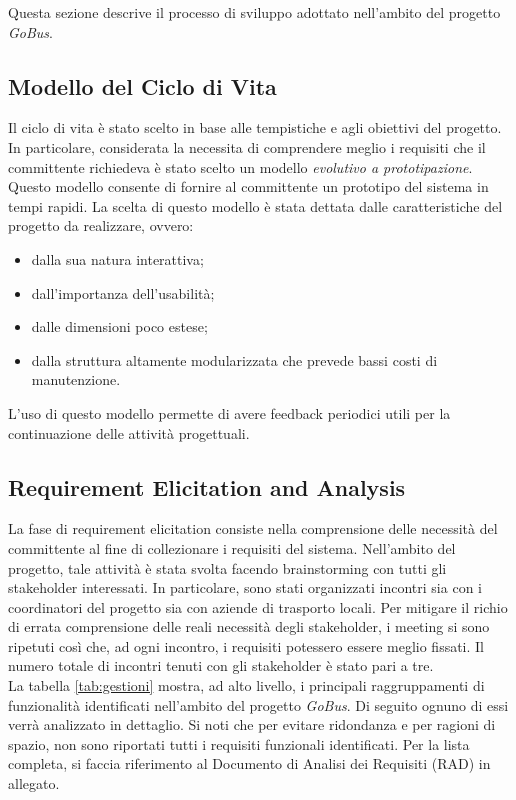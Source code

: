 Questa sezione descrive il processo di sviluppo adottato nell\rq ambito del progetto \emph{GoBus}.

\subsection{Modello del Ciclo di Vita}
Il ciclo di vita è stato scelto in base alle tempistiche e agli obiettivi del progetto. In particolare, considerata la necessita di comprendere meglio i requisiti che il committente richiedeva \`{e} stato scelto un modello \emph{evolutivo a prototipazione}. Questo modello consente di fornire al committente un prototipo del sistema in tempi rapidi. La scelta di questo modello \`{e} stata dettata dalle caratteristiche del progetto da realizzare, ovvero:
\begin{itemize}
\item dalla sua natura interattiva;
\item dall\rq importanza dell\rq usabilit\`{a};
\item dalle dimensioni poco estese;
\item dalla struttura altamente modularizzata che prevede bassi costi di manutenzione.
\end{itemize}
L\rq uso di questo modello permette di avere feedback periodici utili per la continuazione delle attivit\`{a} progettuali.

\subsection{Requirement Elicitation and Analysis}
La fase di requirement elicitation consiste nella comprensione delle necessit\`{a} del committente al fine di collezionare i requisiti del sistema. Nell\rq ambito del progetto, tale attivit\`{a} \`{e} stata svolta facendo brainstorming con tutti gli stakeholder interessati. In particolare, sono stati organizzati incontri sia con i coordinatori del progetto sia con aziende di trasporto locali. Per mitigare il richio di errata comprensione delle reali necessit\`{a} degli stakeholder, i meeting si sono ripetuti cos\`{i} che, ad ogni incontro, i requisiti potessero essere meglio fissati. Il numero totale di incontri tenuti con gli stakeholder \`{e} stato pari a tre.\\
La tabella \ref{tab:gestioni} mostra, ad alto livello, i principali raggruppamenti di funzionalità identificati nell'ambito del progetto \emph{GoBus}. Di seguito ognuno di essi verr\`{a} analizzato in dettaglio. Si noti che per evitare ridondanza e per ragioni di spazio, non sono riportati tutti i requisiti funzionali identificati. Per la lista completa, si faccia riferimento al Documento di Analisi dei Requisiti (RAD) in allegato.\\

